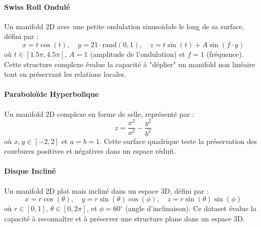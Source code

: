 \documentclass[unnumsec,webpdf,modern,large]{projet_manifold}%
\theoremstyle{thmstyleone}%
\theoremstyle{thmstyletwo}%
\theoremstyle{thmstylethree}%
\begin{document}
\paragraph{Swiss Roll Ondulé} 
Un manifold 2D avec une petite ondulation sinusoïdale le long de sa surface, défini par :
\begin{equation}
    x = t \cos(t), \quad y = 21 \cdot \text{rand}(0,1), \quad z = t \sin(t) + A \sin(f \cdot y)
\end{equation}
où $t \in [1.5\pi, 4.5\pi]$, $A = 1$ (amplitude de l'ondulation) et $f = 1$ (fréquence). Cette structure complexe évalue la capacité à "déplier" un manifold non linéaire tout en préservant les relations locales.

\paragraph{Paraboloïde Hyperbolique} 
Un manifold 2D complexe en forme de selle, représenté par :
\begin{equation}
    z = \frac{x^2}{a^2} - \frac{y^2}{b^2}
\end{equation}
où $x, y \in [-2, 2]$ et $a = b = 1$. Cette surface quadrique teste la préservation des courbures positives et négatives dans un espace réduit.

\paragraph{Disque Incliné} 
Un manifold 2D plat mais incliné dans un espace 3D, défini par :
\begin{equation}
    x = r \cos(\theta), \quad y = r \sin(\theta) \cos(\phi), \quad z = r \sin(\theta) \sin(\phi)
\end{equation}
où $r \in [0, 1]$, $\theta \in [0, 2\pi]$, et $\phi = 60^\circ$ (angle d'inclinaison). Ce dataset évalue la capacité à reconnaître et à préserver une structure plane dans un espace 3D.
\end{document}
